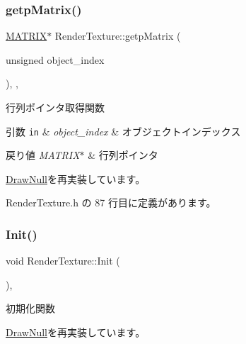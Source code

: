 \subsubsection{\texorpdfstring{getp\+Matrix()}{getpMatrix()}}
{\footnotesize\ttfamily \mbox{\hyperlink{_vector3_d_8h_a032295cd9fb1b711757c90667278e744}{M\+A\+T\+R\+IX}}$\ast$ Render\+Texture\+::getp\+Matrix (\begin{DoxyParamCaption}\item[{unsigned}]{object\+\_\+index }\end{DoxyParamCaption})\hspace{0.3cm}{\ttfamily [inline]}, {\ttfamily [override]}, {\ttfamily [virtual]}}



行列ポインタ取得関数 


\begin{DoxyParams}[1]{引数}
\mbox{\tt in}  & {\em object\+\_\+index} & オブジェクトインデックス \\
\hline
\end{DoxyParams}

\begin{DoxyRetVals}{戻り値}
{\em M\+A\+T\+R\+I\+X$\ast$} & 行列ポインタ \\
\hline
\end{DoxyRetVals}


\mbox{\hyperlink{class_draw_null_a9aac059eb3b5d1f77e8bd3aa0647cff9}{Draw\+Null}}を再実装しています。



 Render\+Texture.\+h の 87 行目に定義があります。

\mbox{\label{class_render_texture_a498eb8be8672e01164b3770cdff43291}} 
\subsubsection{\texorpdfstring{Init()}{Init()}}
{\footnotesize\ttfamily void Render\+Texture\+::\+Init (\begin{DoxyParamCaption}{ }\end{DoxyParamCaption})\hspace{0.3cm}{\ttfamily [inline]}, {\ttfamily [virtual]}}



初期化関数 



\mbox{\hyperlink{class_draw_null_a20aef1e54c1a158b741bfd731e18efdf}{Draw\+Null}}を再実装しています。




